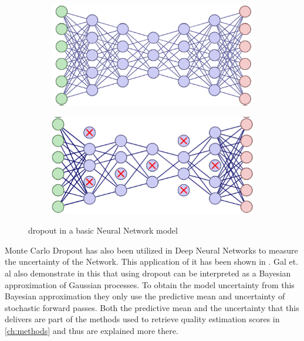 \begin{figure}[ht]
    \centering
    \begin{subfigure}{0.45\textwidth}
        \includegraphics[width=\linewidth]{Latex//sections//images/nondropout.png}
    \end{subfigure}
    \begin{subfigure}{0.45\textwidth}
        \includegraphics[width=\linewidth]{Latex//sections//images/dropout.png}
    \end{subfigure}
    
    \caption{dropout in a basic Neural Network model}
    \label{fig:dropout}
\end{figure}

Monte Carlo Dropout has also been utilized in Deep Neural Networks to measure the uncertainty of the Network.   
This application of it has been shown in \cite{gal2016dropoutbayesianapproximationrepresenting}. Gal et. al also demonstrate in this that using dropout can be interpreted as a Bayesian approximation of Gaussian processes. To obtain the model uncertainty from this Bayesian approximation they only use the predictive mean and uncertainty of stochastic forward passes. Both the predictive mean and the uncertainty that this delivers are part of the methods used to retrieve quality estimation scores in \autoref{ch:methods} and thus are explained more there.

